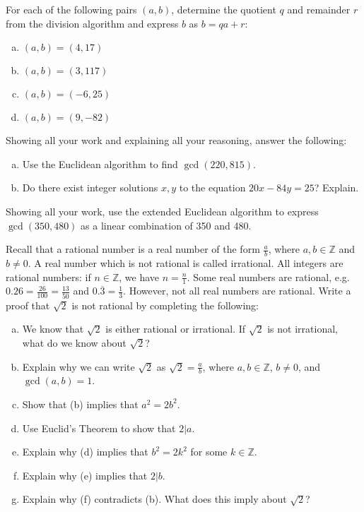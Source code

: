 \documentclass[11pt,letterpaper]{article}
\begin{document}

 For each of the following pairs $(a, b)$, determine the quotient $q$ and remainder $r$ from the division algorithm and express $b$ as $b= qa + r$:
	\begin{enumerate}[(a)]
	\item $(a, b)= (4, 17)$
	\item $(a, b)= (3, 117)$
	\item $(a, b)= (-6, 25)$
	\item $(a, b)= (9, -82)$
	\end{enumerate}



\newpage



 Showing all your work and explaining all your reasoning, answer the following:
	\begin{enumerate}[(a)]
	\item Use the Euclidean algorithm to find $\gcd(220, 815)$. 
	\item Do there exist integer solutions $x, y$ to the equation $20x - 84y= 25$? Explain.
	\end{enumerate}



\newpage



 Showing all your work, use the extended Euclidean algorithm to express $\gcd(350, 480)$ as a linear combination of 350 and 480. 



\newpage



 Recall that a rational number is a real number of the form $\frac{a}{b}$, where $a, b \in \mathbb{Z}$ and $b \neq 0$. A real number which is not rational is called irrational. All integers are rational numbers: if $n \in \mathbb{Z}$, we have $n= \frac{n}{1}$. Some real numbers are rational, e.g. $0.26= \frac{26}{100}= \frac{13}{50}$ and $0.\overline{3}= \frac{1}{3}$. However, not all real numbers are rational. Write a proof that $\sqrt{2}$ is not rational by completing the following:
	\begin{enumerate}[(a)]
	\item We know that $\sqrt{2}$ is either rational or irrational. If $\sqrt{2}$ is not irrational, what do we know about $\sqrt{2}$? 
	\item Explain why we can write $\sqrt{2}$ as $\sqrt{2}= \frac{a}{b}$, where $a, b \in \mathbb{Z}$, $b \neq 0$, and $\gcd(a, b)= 1$. 
	\item Show that (b) implies that $a^2= 2b^2$.
	\item Use Euclid's Theorem to show that $2 | a$. 
	\item Explain why (d) implies that $b^2= 2k^2$ for some $k \in \mathbb{Z}$.
	\item Explain why (e) implies that $2 | b$. 
	\item Explain why (f) contradicts (b). What does this imply about $\sqrt{2}$?
	\end{enumerate}
\end{document}
